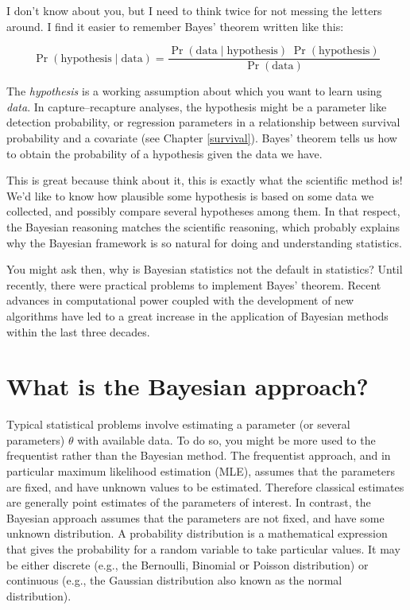 \documentclass[
  12pt,
]{krantz}
\begin{document}
I don't know about you, but I need to think twice for not messing the letters around. I find it easier to remember Bayes' theorem written like this:

\[\Pr(\text{hypothesis} \mid \text{data}) = \frac{ \Pr(\text{data} \mid \text{hypothesis}) \; \Pr(\text{hypothesis})}{\Pr(\text{data})}\]

\begin{blackbox}
The \emph{hypothesis} is a working assumption about which you want to learn using \emph{data}. In capture--recapture analyses, the hypothesis might be a parameter like detection probability, or regression parameters in a relationship between survival probability and a covariate (see Chapter \ref{survival}). Bayes' theorem tells us how to obtain the probability of a hypothesis given the data we have.

\end{blackbox}

This is great because think about it, this is exactly what the scientific method is! We'd like to know how plausible some hypothesis is based on some data we collected, and possibly compare several hypotheses among them. In that respect, the Bayesian reasoning matches the scientific reasoning, which probably explains why the Bayesian framework is so natural for doing and understanding statistics.

You might ask then, why is Bayesian statistics not the default in statistics? Until recently, there were practical problems to implement Bayes' theorem. Recent advances in computational power coupled with the development of new algorithms have led to a great increase in the application of Bayesian methods within the last three decades.

\section{What is the Bayesian approach?}\label{what-is-the-bayesian-approach}

Typical statistical problems involve estimating a parameter (or several parameters) \(\theta\) with available data. To do so, you might be more used to the frequentist rather than the Bayesian method. The frequentist approach, and in particular maximum likelihood estimation (MLE), assumes that the parameters are fixed, and have unknown values to be estimated. Therefore classical estimates are generally point estimates of the parameters of interest. In contrast, the Bayesian approach assumes that the parameters are not fixed, and have some unknown distribution. A probability distribution is a mathematical expression that gives the probability for a random variable to take particular values. It may be either discrete (e.g., the Bernoulli, Binomial or Poisson distribution) or continuous (e.g., the Gaussian distribution also known as the normal distribution).
\end{document}
